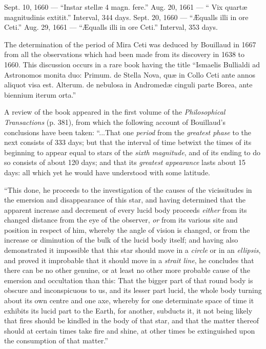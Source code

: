 \documentclass[a4paper, 12pt, oneside, polutonikogreek, english]{article}
\begin{document}
Sept. 10, 1660 --- ``Instar stellæ 4 magn. fere.'' Aug. 20, 1661 --- `` Vix quartæ magnitudinis extitit.'' Interval, 344 days. Sept. 20, 1660 --- ``Æqualls illi in ore Ceti.'' Aug. 29, 1661 --- ``Æqualls illi in ore Ceti.'' Interval, 353 days.

The determination of the period of Mira Ceti was deduced by Bouillaud in 1667 from all the observations which had been made from its discovery in 1638 to 1660. This discussion occurs in a rare book having the title ``Ismaelis Bullialdi ad Astronomos monita duo: Primum. de Stella Nova, quæ in Collo Ceti ante annos aliquot visa est. Alterum. de nebulosa in Andromedæ cinguli parte Borea, ante biennium iterum orta.''

A review of the book appeared in the first volume of the \emph{Philosophical Transactions} (p. 381), from which the following account of Bouillaud's conclusions have been taken: ``...That one \emph{period} from the \emph{greatest phase} to the next consists of 333 days; but that the interval of time betwixt the times of its beginning to appear equal to stars of the \emph{sixth magnitude}, and of its ending to do so consists of about 120 days; and that its \emph{greatest appearance} lasts about 15 days: all which yet he would have understood with some latitude.

``This done, he proceeds to the investigation of the causes of the vicissitudes in the emersion and disappearance of this star, and having determined that the apparent increase and decrement of every lucid body proceeds \emph{either} from its changed distance from the eye of the observer, \emph{or} from its various site and position in respect of him, whereby the angle of vision is changed, or from the increase or diminution of the bulk of the lucid body itself; and having also demonstrated it impossible that this star should move in a \emph{circle} or in an \emph{ellipsis}, and proved it improbable that it should move in a \emph{strait line}, he concludes that there can be no other genuine, or at least no other more probable cause of the emersion and occultation than this: That the bigger part of that round body is obscure and inconspicuous to us, and its lesser part lucid, the whole body turning about its own centre and one axe, whereby for one determinate space of time it exhibits its lucid part to the Earth, for another, subducts it, it not being likely that fires should be kindled in the body of that star, and that the matter thereof should at certain times take fire and shine, at other times be extinguished upon the consumption of that matter.''
\end{document}

